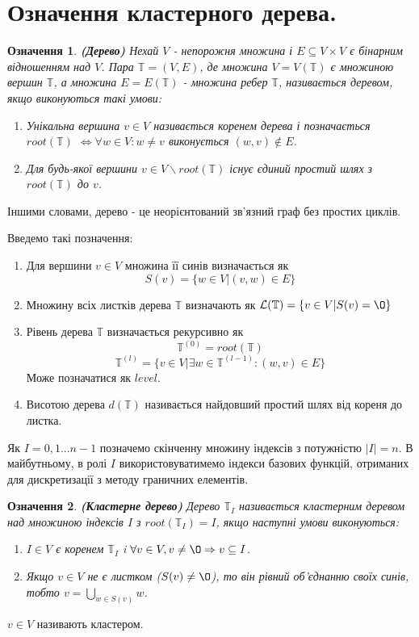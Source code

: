 \documentclass[12pt]{report}
\begin{document}
	\section{Означення кластерного дерева.}
	\newtheorem{Def}{Означення}[chapter]
	\begin{Def}
	{\bf (Дерево)} Нехай $V$ - непорожня множина і $E\subseteq V\times V$ є бінарним відношенням над $V$. Пара $\mathbb{T}=(V,E)$, де множина $V=V(\mathbb{T})$ є множиною вершин $\mathbb{T}$, а множина $E=E(\mathbb{T})$ - множина ребер $\mathbb{T}$, називається деревом, якщо виконуються такі умови:
	\begin{enumerate}
		\item[-] Унікальна вершина $v\in V$ називається коренем дерева і позначається $root(\mathbb{T})$ $\Leftrightarrow \forall w\in V:w\not=v$ виконується $(w,v)\not\in E$.
		\item[-] Для будь-якої вершини $v\in V\backslash root(\mathbb{T})$ існує єдиний простий шлях з $root(\mathbb{T})$ до $v$.
	\end{enumerate}

	\end{Def}
	Іншими словами, дерево - це неорієнтований зв'язний граф без простих циклів.
	\par Введемо такі позначення:
	\begin{enumerate}
		\item[$\bullet$] Для вершини $v\in V$ множина її синів визначається як $$S(v)=\{w\in V |(v,w)\in E \}$$
		\item[$\bullet$] Множину всіх листків дерева $\mathbb{T}$ визначають як $\mathcal{L}(\mathbb{T})=\{v\in V|S(v)=\O \}$
		\item[$\bullet$] Рівень дерева $\mathbb{T}$ визначається рекурсивно як $$\mathbb{T}^{(0)}=root(\mathbb{T})$$
		$$\mathbb{T}^{(l)}=\{v \in V|\exists w\in \mathbb{T}^{(l-1)}:(w,v)\in E\}$$
		Може позначатися як $level$.
		\item[$\bullet$] Висотою дерева $d(\mathbb{T})$ називається найдовший простий шлях від кореня до листка.
	\end{enumerate}
	
	\hspace{0.8cm}Як $I={0,1...n-1}$ позначемо скінченну множину індексів з потужністю $|I|=n$. В майбутньому, в ролі $I$ використовуватимемо індекси базових функцій, отриманих для дискретизації з методу граничних елементів.
	\begin{Def}
	 {\bf (Кластерне дерево)} Дерево $\mathbb{T}_{I}$ називається кластерним деревом над множиною індексів $I$ з $root(\mathbb{T}_{I})=I$, якщо наступні умови виконуються:
	\begin{enumerate}
		\item[-] $I \in V$ є коренем $\mathbb{T}_{I}$ i $\forall v \in V,v\not=\O \Rightarrow v\subseteq I$.
		\item[-] Якщо $v\in V$ не є листком ($S(v)\not=\O$), то він рівний об'єднанню своїх синів, тобто $v=\bigcup_{w\in S(v)}w$.
	\end{enumerate}
	\end{Def}
	\par $v\in V$ називають кластером.
	
\end{document}
